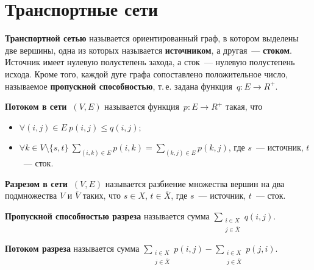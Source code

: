 \section{Транспортные сети}
   \textbf{Транспортной сетью} называется ориентированный граф, в котором выделены две вершины, одна из которых называется \textbf{источником}, а другая~--- \textbf{стоком}.
Источник имеет нулевую полустепень захода, а сток~--- нулевую полустепень исхода.
 Кроме того, каждой дуге графа сопоставлено положительное число, называемое \textbf{пропускной способностью}, т.\,е. задана функция~$q \colon E \to R^+$.

 \textbf{Потоком в сети~$(V, E)$} называется функция~$p \colon E \to R^+$ такая, что
\begin{itemize}
	\item $\forall (i, j) \in E \ p(i, j) \leqslant q(i, j)$;
	\item $\displaystyle \forall k \in V \setminus \{ s, t \} \ \sum_{(i, k) \in E} p(i, k) = \sum_{(k, j) \in E} p(k, j)$, где $s$~--- источник, $t$~--- сток.
\end{itemize}

 \textbf{Разрезом в сети~$(V, E)$} называется разбиение множества вершин на два подмножества $V$ и $\overline V$ таких, что $s \in X$, $t \in \overline X$, где $s$~--- источник, $t$~--- сток.

\textbf{Пропускной способностью разреза} называется сумма $\displaystyle \sum_{\begin{smallmatrix}
i \in X \\
j \in \overline X
\end{smallmatrix}} q(i, j)$.

\textbf{Потоком разреза} называется сумма $\displaystyle \sum_{\begin{smallmatrix}
i \in X \\
j \in \overline X
\end{smallmatrix}} p(i, j) -
\sum_{\begin{smallmatrix}
i \in X \\
j \in \overline X
\end{smallmatrix}} p(j, i)$.